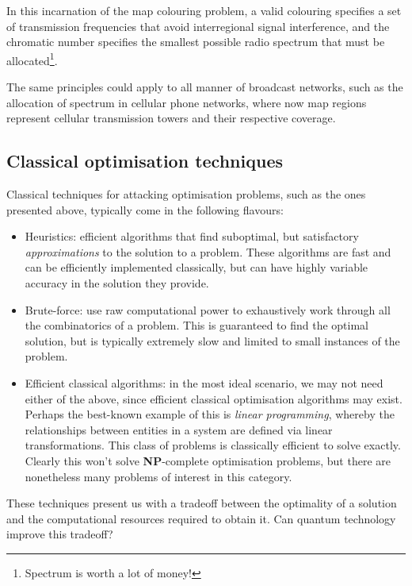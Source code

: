 In this incarnation of the map colouring problem, a valid colouring specifies a set of transmission frequencies that avoid interregional signal interference, and the chromatic number specifies the smallest possible radio spectrum that must be allocated\footnote{Spectrum is worth a lot of money!}.

The same principles could apply to all manner of broadcast networks, such as the allocation of spectrum in cellular phone networks, where now map regions represent cellular transmission towers and their respective coverage.

\subsection{Classical optimisation techniques}

Classical techniques for attacking optimisation problems, such as the ones presented above, typically come in the following flavours:
\begin{itemize}
	\item Heuristics: efficient algorithms that find suboptimal, but satisfactory \textit{approximations} to the solution to a problem. These algorithms are fast and can be efficiently implemented classically, but can have highly variable accuracy in the solution they provide.
	\item Brute-force: use raw computational power to exhaustively work through all the combinatorics of a problem. This is guaranteed to find the optimal solution, but is typically extremely slow and limited to small instances of the problem.
	\item Efficient classical algorithms: in the most ideal scenario, we may not need either of the above, since efficient classical optimisation algorithms may exist. Perhaps the best-known example of this is \textit{linear programming}, whereby the relationships between entities in a system are defined via linear transformations. This class of problems is classically efficient to solve exactly. Clearly this won't solve \textbf{NP}-complete optimisation problems, but there are nonetheless many problems of interest in this category.
\end{itemize}

These techniques present us with a tradeoff between the optimality of a solution and the computational resources required to obtain it. Can quantum technology improve this tradeoff?

